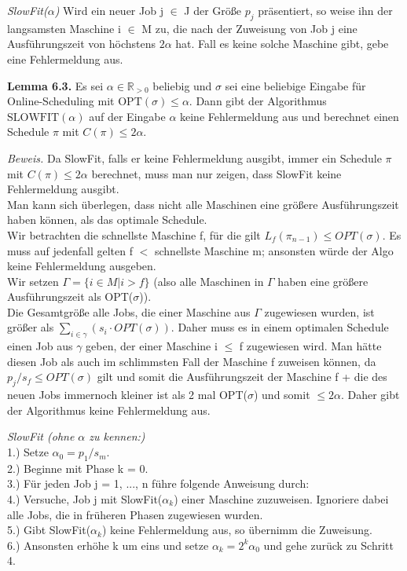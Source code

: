\textit{SlowFit($\alpha$)} Wird ein neuer Job j $\in$ J der Größe $p_{j}$ präsentiert, so weise ihn der langsamsten Maschine i $\in$ M zu, die nach der Zuweisung von Job j eine Ausführungszeit von höchstens $2 \alpha$ hat. Fall es keine solche Maschine gibt, gebe eine Fehlermeldung aus.

\textbf{Lemma 6.3.} Es sei $\alpha \in \mathbb{R}_{>0}$ beliebig und $\sigma$ sei eine beliebige Eingabe für Online-Scheduling mit $\textrm{OPT}(\sigma) \leq \alpha$. Dann gibt der Algorithmus $\textrm{SLOWFIT}(\alpha)$ auf der Eingabe $\alpha$ keine Fehlermeldung aus und berechnet einen Schedule $\pi$ mit $C(\pi) \leq 2 \alpha$.

\textit{Beweis.} Da SlowFit, falls er keine Fehlermeldung ausgibt, immer ein Schedule $\pi$ mit $C(\pi) \le 2 \alpha$ berechnet, muss man nur zeigen, dass SlowFit keine Fehlermeldung ausgibt.\\
Man kann sich überlegen, dass nicht alle Maschinen eine größere Ausführungszeit haben können, als das optimale Schedule. \\
Wir betrachten die schnellste Maschine f, für die gilt $L_{f}(\pi_{n-1}) \le OPT(\sigma)$. Es muss auf jedenfall gelten f $<$ schnellste Maschine m; ansonsten würde der Algo keine Fehlermeldung ausgeben.\\
Wir setzen $\Gamma = \{i \in M | i > f\}$ (also alle Maschinen in $\Gamma$ haben eine größere Ausführungszeit als OPT($\sigma$)).\\
Die Gesamtgröße alle Jobs, die einer Maschine aus $\Gamma$ zugewiesen wurden, ist größer als $\sum_{i \in \gamma}(s_{i} \cdot OPT(\sigma))$. Daher muss es in einem optimalen Schedule einen Job aus $\gamma$ geben, der einer Maschine i $\le$ f zugewiesen wird. Man hätte diesen Job als auch im schlimmsten Fall der Maschine f zuweisen können, da $p_{j}/s_{f} \le OPT(\sigma)$ gilt und somit die Ausführungszeit der Maschine f + die des neuen Jobs immernoch kleiner ist als 2 mal OPT($\sigma$) und somit $\le 2\alpha$. Daher gibt der Algorithmus keine Fehlermeldung aus.

\textit{SlowFit (ohne $\alpha$ zu kennen:)}\\
1.) Setze $\alpha_{0} = p_{1}/s_{m}$. \\
2.) Beginne mit Phase k = 0. \\
3.) Für jeden Job j = 1, ..., n führe folgende Anweisung durch: \\
4.) Versuche, Job j mit SlowFit($\alpha_{k}$) einer Maschine zuzuweisen. Ignoriere dabei alle Jobs, die in früheren Phasen zugewiesen wurden. \\
5.) Gibt SlowFit($\alpha_{k}$) keine Fehlermeldung aus, so übernimm die Zuweisung. \\
6.) Ansonsten erhöhe k um eins und setze $\alpha_{k} = 2^{k}\alpha_{0}$ und gehe zurück zu Schritt 4. \\


